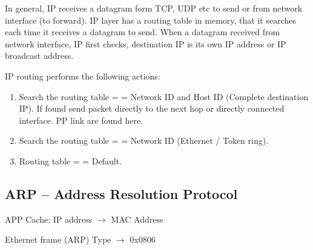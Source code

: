 \documentclass[letterpaper,10pt,english]{sphinxmanual}
\begin{document}
In general, IP receives a datagram form TCP, UDP etc to send or from network interface (to forward). IP layer has a routing table in memory, that it searches each time it receives a datagram to send. When a datagram received from network interface, IP first checks, destination IP is its own IP address or IP broadcast address.

IP routing performs the following actions:
\begin{enumerate}
\item {} 
Search the routing table = = Network ID and Host ID (Complete destination IP). If found send packet directly to the next hop or directly connected interface. PP link are found here.

\item {} 
Search the routing table = = Network ID (Ethernet / Token ring).

\item {} 
Routing table = = Default.

\end{enumerate}


\subsection{ARP – Address Resolution Protocol}
\label{week-06:arp-address-resolution-protocol}
APP Cache: IP address \(\rightarrow\)  MAC Address

Ethernet frame (ARP) Type \(\rightarrow\)  0x0806
\end{document}
